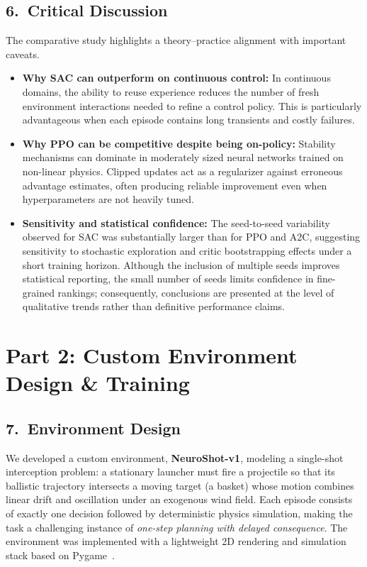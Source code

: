 \documentclass[a4paper,11pt,notitlepage]{report}
\begin{document}
\section{6.\ Critical Discussion}
The comparative study highlights a theory--practice alignment with important caveats.
\begin{itemize}
    \item \textbf{Why SAC can outperform on continuous control:} In continuous domains, the ability to reuse experience reduces the number of fresh environment interactions needed to refine a control policy. This is particularly advantageous when each episode contains long transients and costly failures.
    \item \textbf{Why PPO can be competitive despite being on-policy:} Stability mechanisms can dominate in moderately sized neural networks trained on non-linear physics. Clipped updates act as a regularizer against erroneous advantage estimates, often producing reliable improvement even when hyperparameters are not heavily tuned.
    \item \textbf{Sensitivity and statistical confidence:} The seed-to-seed variability observed for SAC was substantially larger than for PPO and A2C, suggesting sensitivity to stochastic exploration and critic bootstrapping effects under a short training horizon. Although the inclusion of multiple seeds improves statistical reporting, the small number of seeds limits confidence in fine-grained rankings; consequently, conclusions are presented at the level of qualitative trends rather than definitive performance claims.
\end{itemize}

\newpage
\chapter{Part 2: Custom Environment Design \& Training}

\section{7.\ Environment Design}
We developed a custom environment, \textbf{NeuroShot-v1}, modeling a single-shot interception problem: a stationary launcher must fire a projectile so that its ballistic trajectory intersects a moving target (a basket) whose motion combines linear drift and oscillation under an exogenous wind field. Each episode consists of exactly one decision followed by deterministic physics simulation, making the task a challenging instance of \emph{one-step planning with delayed consequence}. The environment was implemented with a lightweight 2D rendering and simulation stack based on Pygame~\cite{pygame}.
\end{document}
